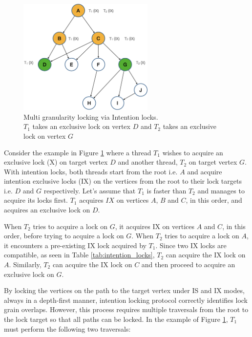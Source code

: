 \begin{figure}[h]
    \centering
    \captionsetup{justification=centering}
    \includegraphics[width=0.6\textwidth]{figures/IntentionLockExample.png}
    \caption{Multi granularity locking via Intention locks. \\ $T_1$ takes an exclusive lock on vertex $D$ and $T_2$ takes an exclusive lock on vertex $G$ }
    \label{fig:intention_lock_example}
\end{figure}

Consider the example in Figure \ref{fig:intention_lock_example} where a thread $T_1$ wishes to acquire an exclusive lock (X) on target vertex $D$ and another thread, $T_2$ on target vertex $G$. 
With intention locks, both threads start from the root i.e. $A$ and acquire intention exclusive locks (IX) on the vertices from the root to their lock targets i.e. $D$ and $G$ respectively. 
Let's assume that $T_1$ is faster than $T_2$ and manages to acquire its locks first. 
$T_1$ acquires $IX$ on vertices $A$, $B$ and $C$, in this order, and acquires an exclusive lock on $D$. 

When $T_2$ tries to acquire a lock on $G$, it acquires IX on vertices $A$ and $C$, in this order, before trying to acquire a lock on $G$. 
When $T_2$ tries to acquire a lock on $A$, it encounters a pre-existing  IX lock acquired by $T_1$. 
Since two IX locks are compatible, as seen in Table \ref{tab:intention_locks}, $T_2$ can acquire the IX lock on $A$.
Similarly, $T_2$ can acquire the IX lock on $C$ and then proceed to acquire an exclusive lock on $G$.


By locking the vertices on the path to the target vertex under IS and IX modes, always in a depth-first manner, 
intention locking protocol correctly identifies lock grain overlaps. 
However, this process requires multiple traversals from the root to the lock target so that all paths can be locked. 
In the example of Figure \ref{fig:intention_lock_example}, $T_1$ must perform the following two traversals:

